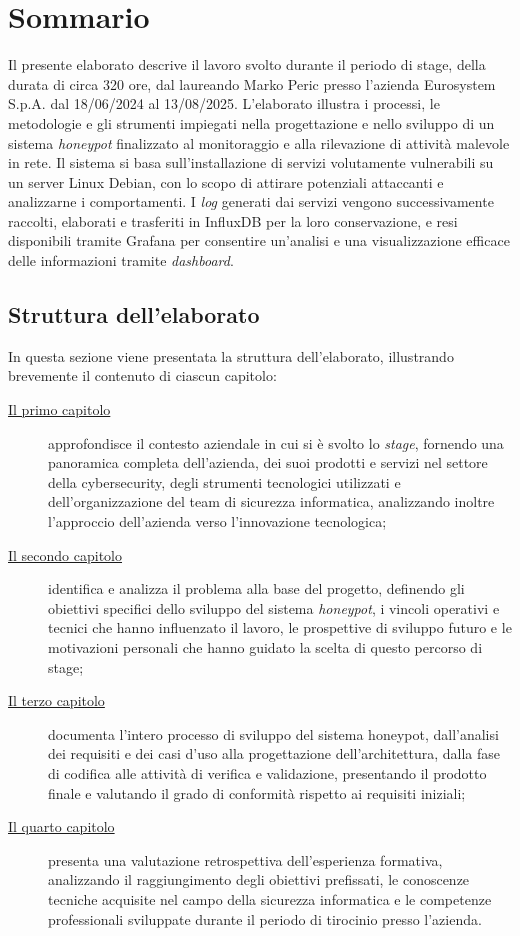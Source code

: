 \cleardoublepage
{}
{}
\begingroup
\let\clearpage\relax
\let\cleardoublepage\relax
\chapter*{Sommario}
Il presente elaborato descrive il lavoro svolto durante il periodo di stage, della durata di circa
320 ore, dal laureando Marko Peric presso l'azienda Eurosystem S.p.A. dal 18/06/2024 al
13/08/2025.
L'elaborato illustra i processi, le metodologie e gli strumenti impiegati nella progettazione e nello sviluppo di un sistema \textit{honeypot} finalizzato al monitoraggio e alla rilevazione di attività malevole in rete. Il sistema si basa sull'installazione di servizi volutamente vulnerabili su un server Linux Debian, con lo scopo di attirare potenziali attaccanti e analizzarne i comportamenti. I \textit{log} generati dai servizi vengono successivamente raccolti, elaborati e trasferiti in InfluxDB per la loro conservazione, e resi disponibili tramite Grafana per consentire un'analisi e una visualizzazione efficace delle informazioni tramite \textit{dashboard}.
\section*{Struttura dell'elaborato}
In questa sezione viene presentata la struttura dell'elaborato, illustrando brevemente il contenuto di ciascun capitolo:
\begin{description}
    \item[{\hyperref[chap:]{Il primo capitolo}}] approfondisce il contesto aziendale in cui si è svolto lo \textit{stage}, fornendo una panoramica completa dell'azienda, dei suoi prodotti e servizi nel settore della cybersecurity, degli strumenti tecnologici utilizzati e dell'organizzazione del team di sicurezza informatica, analizzando inoltre l'approccio dell'azienda verso l'innovazione tecnologica;

    \item[{\hyperref[chap:]{Il secondo capitolo}}] identifica e analizza il problema alla base del progetto, definendo gli obiettivi specifici dello sviluppo del sistema \textit{honeypot}, i vincoli operativi e tecnici che hanno influenzato il lavoro, le prospettive di sviluppo futuro e le motivazioni personali che hanno guidato la scelta di questo percorso di stage;

    \item[{\hyperref[chap:]{Il terzo capitolo}}] documenta l'intero processo di sviluppo del sistema honeypot, dall'analisi dei requisiti e dei casi d'uso alla progettazione dell'architettura, dalla fase di codifica alle attività di verifica e validazione, presentando il prodotto finale e valutando il grado di conformità rispetto ai requisiti iniziali;
    
    \item[{\hyperref[chap:]{Il quarto capitolo}}] presenta una valutazione retrospettiva dell'esperienza formativa, analizzando il raggiungimento degli obiettivi prefissati, le conoscenze tecniche acquisite nel campo della sicurezza informatica e le competenze professionali sviluppate durante il periodo di tirocinio presso l'azienda.
\end{description}
